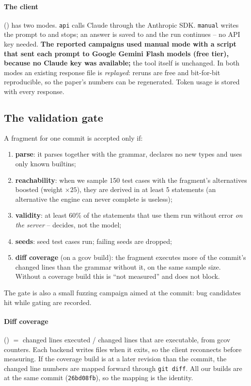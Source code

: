 \paragraph{The client} () has two modes. \texttt{api} calls
Claude through the Anthropic SDK. \texttt{manual} writes the prompt to
 and stops; an answer is saved to
 and the run continues -- no API key needed.
\textbf{The reported campaigns used manual mode with a script that sent each
prompt to Google Gemini Flash models (free tier), because no Claude key was
available;} the tool itself is unchanged. In both modes an existing response file is \emph{replayed}: reruns are
free and bit-for-bit reproducible, so the paper's numbers can be regenerated.
Token usage is stored with every response.

\subsection{The validation gate}
\label{sec:gate}

A fragment for one commit is accepted only if:
\begin{enumerate}
  \item \textbf{parse}: it parses together with the grammar, declares no new
    types and uses only known builtins;
  \item \textbf{reachability}: when we sample 150 test cases with the
    fragment's alternatives boosted (weight $\times 25$), they are derived in at
    least 5 statements (an alternative the engine can never complete is
    useless);
  \item \textbf{validity}: at least 60\% of the statements that use them run
    without error \emph{on the server} -- \pg decides, not the model;
  \item \textbf{seeds}: seed test cases run; failing seeds are dropped;
  \item \textbf{diff coverage} (on a gcov build): the fragment executes more of
    the commit's changed lines than the grammar without it, on the same sample
    size. Without a coverage build this is ``not measured'' and does not block.
\end{enumerate}
The gate is also a small fuzzing campaign aimed at the commit: bug candidates
hit while gating are recorded.

\paragraph{Diff coverage} () $=$ changed lines executed /
changed lines that are executable, from gcov counters. Each backend writes
 files when it exits, so the client reconnects before measuring.
If the coverage build is at a later revision than the commit, the changed line
numbers are mapped forward through \texttt{git diff}. All our builds are at the
same commit (\texttt{26bd08fb}), so the mapping is the identity.

